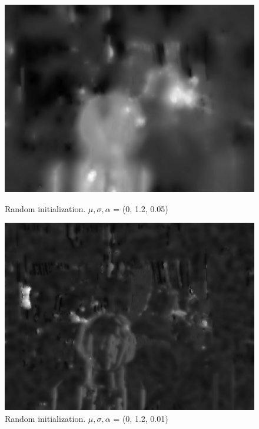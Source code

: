 \documentclass[11pt]{article} %
\begin{document}
    \begin{figure}[ht]
  \centering
  \begin{minipage}[b]{0.45\textwidth}
    \includegraphics[width=\textwidth]{output5.png}
    \caption{Random initialization. $\mu, \sigma, \alpha$ = (0, 1.2, 0.05)}
    \label{fig:image1}
  \end{minipage}
  \hfill
  \begin{minipage}[b]{0.45\textwidth}
    \includegraphics[width=\textwidth]{output6.png}
    \caption{Random initialization. $\mu, \sigma, \alpha$ = (0, 1.2, 0.01)}
    \label{fig:image2}
  \end{minipage}
  \end{figure}
\end{document}
